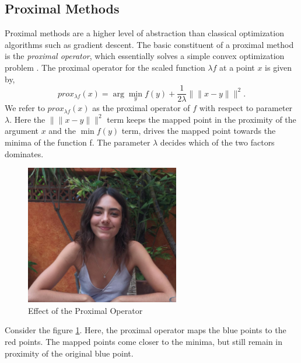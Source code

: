 \subsection{Proximal Methods}
Proximal methods are a higher level of abstraction than classical optimization algorithms such as gradient descent. The basic constituent of a proximal method is the \emph{proximal operator}, which essentially solves a simple convex optimization problem \cite{prox_book}. The proximal operator for the scaled function $\lambda f$ at a point $x$ is given by,
\begin{equation}
prox_{\lambda f}(x) = \arg \min_y f(y) + \frac{1}{2\lambda} \|\| x - y \|\|^2.
\end{equation}
We refer to $prox_{\lambda f}(x)$ as the proximal operator of $f$ with respect to parameter $\lambda$.
Here the $\|\| x - y \|\|^2$ term keeps the mapped point in the proximity of the argument $x$ and the $\min f(y)$ term, drives the mapped point towards the minima of the function f. The parameter $\lambda$ decides which of the two factors dominates.


\begin{figure}[h]
	\centering \vspace{-0.1in}
	\includegraphics[width=0.6\textwidth]{images/proximal.png}	
	\vspace{-20pt} \caption[Effect of the proximal Operator]{\small Effect of the Proximal Operator \footnotemark}
	\label{fig:proximal_operator}
\end{figure}
Consider the figure \ref{fig:proximal_operator}. Here, the proximal operator maps the blue points to the red points.
The mapped points come closer to the minima, but still remain in proximity of the original blue point.

